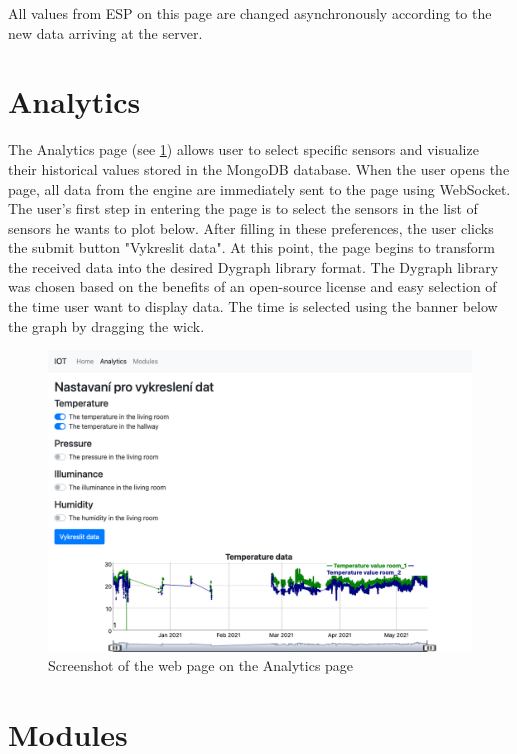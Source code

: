 All values from ESP on this page are changed asynchronously according to the new data arriving at the server.

\section{Analytics}

The Analytics page (see \cref{fig:web_analytics}) allows user to select specific sensors and visualize their historical values stored in the MongoDB database. When the user opens the page, all data from the engine are immediately sent to the page using WebSocket. The user's first step in entering the page is to select the sensors in the list of sensors he wants to plot below. After filling in these preferences, the user clicks the submit button "Vykreslit data". At this point, the page begins to transform the received data into the desired Dygraph library format. The Dygraph library was chosen based on the benefits of an open-source license and easy selection of the time user want to display data. The time is selected using the banner below the graph by dragging the wick.

\begin{figure}[H]
    \centering
    \includegraphics[width=\textwidth]{img/web_analytics.png}
    \caption{Screenshot of the web page on the Analytics page}
    \label{fig:web_analytics}
\end{figure}

\section{Modules} \label{section:modules}

